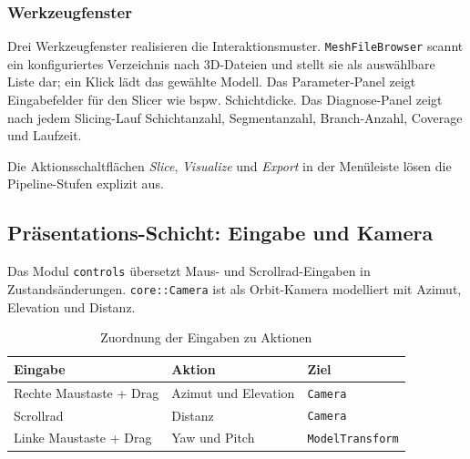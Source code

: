             \subsubsection{Werkzeugfenster}\label{subsubsec:impl-medusa-tool-windows}
                Drei Werkzeugfenster realisieren die Interaktionsmuster.
                \texttt{MeshFileBrowser} scannt ein konfiguriertes Verzeichnis nach 3D-Dateien und stellt sie als auswählbare Liste dar; ein Klick lädt das gewählte Modell.
                Das Parameter-Panel zeigt Eingabefelder für den Slicer wie bspw. Schichtdicke.
                Das Diagnose-Panel zeigt nach jedem Slicing-Lauf Schichtanzahl, Segmentanzahl, Branch-Anzahl, Coverage und Laufzeit.

                Die Aktionsschaltflächen \emph{Slice}, \emph{Visualize} und \emph{Export} in der Menüleiste lösen die Pipeline-Stufen explizit aus.

        \subsection{Präsentations-Schicht: Eingabe und Kamera}\label{subsec:impl-medusa-controls}
            Das Modul \texttt{controls} übersetzt Maus- und Scrollrad-Eingaben in Zustandsänderungen.
            \texttt{core::Camera} ist als Orbit-Kamera modelliert mit Azimut, Elevation und Distanz.

            \begin{table}[ht]
                \centering
                \caption[Eingabe-Aktion-Zuordnung]{Zuordnung der Eingaben zu Aktionen}
                \label{tab:impl-medusa-input-mapping}
                \renewcommand{\arraystretch}{1.2}
                \begin{tabular}{@{} l l l @{}}
                    \toprule
                    \textbf{Eingabe}             & \textbf{Aktion}        & \textbf{Ziel} \\
                    \midrule
                    Rechte Maustaste + Drag      & Azimut und Elevation   & \texttt{Camera} \\
                    Scrollrad                    & Distanz                & \texttt{Camera} \\
                    Linke Maustaste + Drag       & Yaw und Pitch          & \texttt{ModelTransform} \\
                    \bottomrule
                \end{tabular}
            \end{table}

